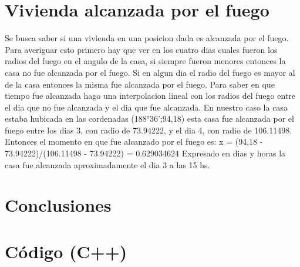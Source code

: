 \documentclass[12pt,spanish]{article}
\begin{document}
\section*{Vivienda alcanzada por el fuego}
Se busca saber si una vivienda en una posicion dada es alcanzada por el fuego.
Para averiguar esto primero hay que ver en los cuatro dias cuales fueron los radios del fuego en el angulo de la casa, si siempre fueron menores entonces la casa no fue alcanzada por el fuego.
Si en algun dia el radio del fuego es mayor al de la casa entonces la misma fue alcanzada por el fuego. Para saber en que tiempo fue alcanzada hago una interpolacion lineal con los radios del fuego entre el dia que no fue alcanzada y el dia que fue alcanzada.
En nuestro caso la casa estaba hubicada en las cordenadas (188°36';94,18) esta casa fue alcanzada por el fuego entre los dias 3, con radio de 73.94222, y el dia 4, con radio de 106.11498.
Entonces el momento en que fue alcanzado por el fuego es: x = (94,18 - 73.94222)/(106.11498 - 73.94222) = 0.629034624
Expresado en dias y horas la casa fue alcanzada aproximadamente el dia 3 a las 15 hs.
\section*{Conclusiones}

\newpage
\section{Código (C++)}

\end{document}
